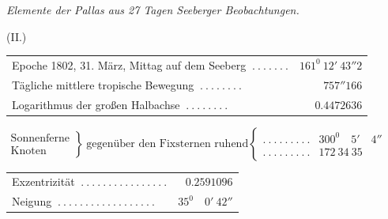 \begin{center}
\textit{Elemente der Pallas aus 27 Tagen Seeberger Beobachtungen.}\par\medskip
(II.)\par\medskip
{\small\setlength{\tabcolsep}{2pt}
\begin{tabular}{l r}
Epoche 1802, 31. März, Mittag auf dem Seeberg $\ .\ .\ .\ .\ .\ .\ .$&$161^0\ 12'\ 43''2$\\
Tägliche mittlere tropische Bewegung $\ .\ .\ .\ .\ .\ .\ .\ .$&$757''166$\\
Logarithmus der großen Halbachse $\ .\ .\ .\ .\ .\ .\ .\ .$&$0.4472636$
\end{tabular}
\par\smallskip
$\left.\begin{array}{l}\text{Sonnenferne}\\\text{Knoten}\end{array}\right\}\ \text{gegenüber den Fixsternen ruhend}\left\{\begin{array}{lr}
.\ .\ .\ .\ .\ .\ .\ .\ .&300^0\quad5'\quad4''\\
.\ .\ .\ .\ .\ .\ .\ .\ .&172\ 34\ 35
\end{array}\right.$
\par\smallskip
\begin{tabular}{l r}
Exzentrizität $\ .\ .\ .\ .\ .\ .\ .\ .\ .\ .\ .\ .\ .\ .\ .\ .$&$0.2591096$\\
Neigung $\ .\ .\ .\ .\ .\ .\ .\ .\ .\ .\ .\ .\ .\ .\ .\ .\ .\ .$&$35^0\quad0'\ 42''$
\end{tabular}}
\end{center}

